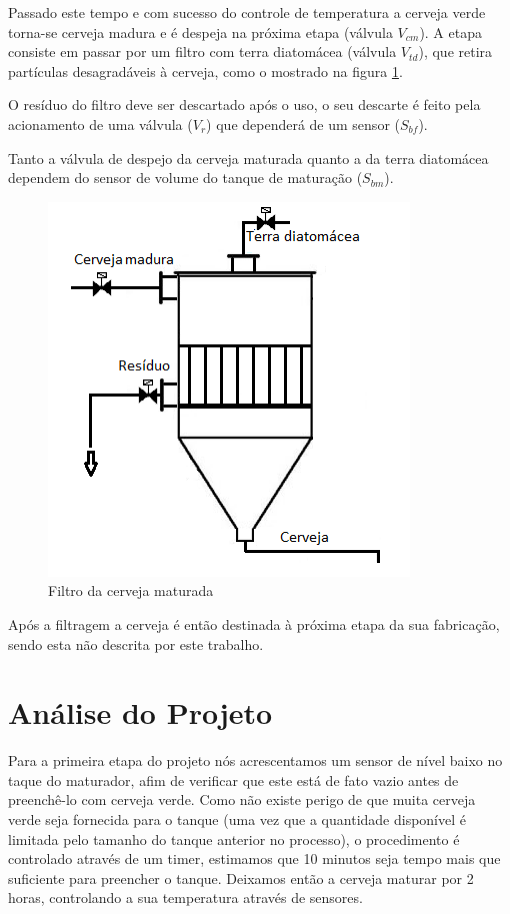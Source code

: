 \documentclass[twoside,twocolumn, 12pt]{paper}
\begin{document}
	Passado este tempo e com sucesso do controle de temperatura a cerveja verde torna-se cerveja madura e é despeja na próxima etapa (válvula $V_{cm}$). A etapa consiste em passar por um filtro com terra diatomácea (válvula $V_{td}$), que retira partículas desagradáveis à cerveja, como o mostrado na figura \ref{fig:filtro}. 
	
	O resíduo do filtro deve ser descartado após o uso, o seu descarte é feito pela acionamento de uma válvula ($V_r$) que dependerá de um sensor ($S_{bf}$).
	
	
	Tanto a válvula de despejo da cerveja maturada quanto a da terra diatomácea dependem do sensor de volume do tanque de maturação ($S_{bm}$).
	
	\begin{figure}
		\centering
		\includegraphics [width=\columnwidth]{filtro.png}
		\caption {Filtro da cerveja maturada}
		\label{fig:filtro}
	\end{figure}
	
	Após a filtragem a cerveja é então destinada à próxima etapa da sua fabricação, sendo esta não descrita por este trabalho.
	
	\section {Análise do Projeto}
	\label{sec:analise}
	Para a primeira etapa do projeto nós acrescentamos um sensor de nível baixo no taque do maturador, afim de verificar que este está de fato vazio antes de preenchê-lo com cerveja verde. Como não existe perigo de que muita cerveja verde seja fornecida para o tanque (uma vez que a quantidade disponível é limitada pelo tamanho do tanque anterior no processo), o procedimento é controlado através de um timer, estimamos que 10 minutos seja tempo mais que suficiente para preencher o tanque. Deixamos então a cerveja maturar por 2 horas, controlando a sua temperatura através de sensores.
	
\end{document}
